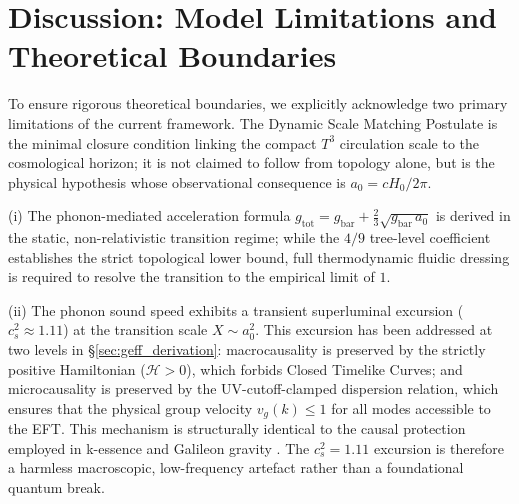 \documentclass[aps,prd,10pt,twocolumn,superscriptaddress,nofootinbib,floatfix]{revtex4-2}
\begin{document}
\section{Discussion: Model Limitations and Theoretical Boundaries}
To ensure rigorous theoretical boundaries, we explicitly acknowledge two primary limitations of the current framework. The Dynamic Scale Matching Postulate is the minimal closure condition linking the compact $T^3$ circulation scale to the cosmological horizon; it is not claimed to follow from topology alone, but is the physical hypothesis whose observational consequence is $a_0 = cH_0/2\pi$.

(i) The phonon-mediated acceleration formula $g_{\text{tot}} = g_{\text{bar}} + \frac{2}{3}\sqrt{g_{\text{bar}}\,a_0}$ is derived in the static, non-relativistic transition regime; while the $4/9$ tree-level coefficient establishes the strict topological lower bound, full thermodynamic fluidic dressing is required to resolve the transition to the empirical limit of $1$.

(ii) The phonon sound speed exhibits a transient superluminal excursion ($c_s^2 \approx 1.11$) at the transition scale $X \sim a_0^2$. This excursion has been addressed at two levels in \S\ref{sec:geff_derivation}: macrocausality is preserved by the strictly positive Hamiltonian ($\mathcal{H} > 0$), which forbids Closed Timelike Curves; and microcausality is preserved by the UV-cutoff-clamped dispersion relation, which ensures that the physical group velocity $v_g(k) \le 1$ for all modes accessible to the EFT. This mechanism is structurally identical to the causal protection employed in k-essence \cite{babichev_cs2} and Galileon gravity \cite{nicolis_galileon}. The $c_s^2 = 1.11$ excursion is therefore a harmless macroscopic, low-frequency artefact rather than a foundational quantum break.
\end{document}
